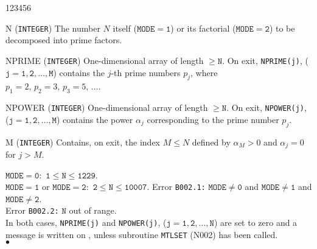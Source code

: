 \begin{DLtt}{123456}
\item[N] ({\tt INTEGER}) The number $N$ itself ($\mathtt{MODE=1}$) or
its factorial ($\mathtt{MODE=2}$) to be decomposed into prime factors.
\item[NPRIME] ({\tt INTEGER}) One-dimensional array of length
$\mathtt{\ge N}$. On exit, {\tt NPRIME(j)}, ($\mathtt{j=1,2,\ldots,M}$)
contains the $j$-th prime numbers $p_j$,
where $p_1=2,\,p_2=3,\,p_3=5,\,\ldots$.
\item[NPOWER] ({\tt INTEGER}) One-dimensional array of length
$\mathtt{\ge N}$. On exit, {\tt NPOWER(j)}, ($\mathtt{j=1,2,\ldots,M}$)
contains the power $\alpha_j$ corresponding to the prime number $p_j$.
\item[M] ({\tt INTEGER}) Contains, on exit, the index $M \le N$ defined
by $\alpha_M>0$ and $\alpha_j=0$ for $j>M$.
\end{DLtt}
\Restrict
$\mathtt{MODE=0:}$ $\mathtt{1 \le N \le 1229}$. \\
$\mathtt{MODE=1}$ or $\mathtt{MODE=2:}$ $\mathtt{2 \le N \le 10007}$.
\Errorh
Error {\tt B002.1:} $\mathtt{MODE \ne 0}$ and $\mathtt{MODE \ne 1}$
and $\mathtt{MODE \ne 2}$. \\
Error {\tt B002.2:} $\mathtt{N}$ out of range. \\
In both cases, {\tt NPRIME(j)} and {\tt NPOWER(j)},
($\mathtt{j=1,2,\ldots,N}$) are set to zero and a message is written
on , unless subroutine {\tt MTLSET} (N002) has been called.
\\ $\bullet$
